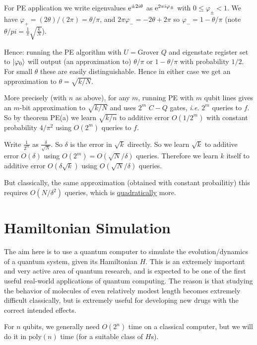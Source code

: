 \documentclass[]{article}
\renewcommand{\phi}{\varphi}
\newcommand{\poly}{\textrm{poly}}
\begin{document}
\begin{enumerate}
	For PE application we write eigenvalues $\mathrm{e}^{\pm2i\theta}$ as $\e^{2\pi i\phi_{\pm}}$ with $0\le \phi_{\pm} < 1$. We have $\phi_+ = (2\theta)/(2\pi) = \theta/\pi$, and $2\pi \phi_- = -2\theta+2\pi$ so $\phi_- = 1 - \theta/\pi$ (note $\theta/pi = \frac{1}{\pi}\sqrt{\frac{k}{N}}$).

	Hence: running the PE algorithm with $U = \textrm{Grover }Q$ and eigenstate register set to $\ket{\phi_0}$ will output (an approximation to) $\theta/\pi$ or $1 - \theta/\pi$ with probability $1/2$. For small $\theta$ these are easily distinguishable. Hence in either case we get an approximation to $\theta = \sqrt{k/N}$.

	More precisely (with $n$ as above), for any $m$, running PE with $m$ qubit lines gives an $m$-bit approximation to $\sqrt{k/N}$ and uses $2^m$ $C-Q$ gates, \textit{i.e.} $2^m$ queries to $f$. So by theorem PE(a) we learn $\sqrt{k/n}$ to additive error $O(1/2^m)$ with constant probability $4/\pi^2$ using $O(2^m)$ queries to $f$.

	Write $\frac{1}{2^m}$ as $\frac{\delta}{\sqrt{N}}$. So $\delta$ is the error in $\sqrt{k}$ directly. So we learn $\sqrt{k}$ to additive error $O(\delta)$ using $O(2^m) = O(\sqrt{N}/\delta)$ queries. Therefore we learn $k$ itself to additive error $O(\delta\sqrt{k})$ using $O(\sqrt{N}/\delta)$ queries.

	But classically, the same approximation (obtained with constant probailitiy) this requires $O(N/\delta^2)$ queries, which is \underline{quadratically} more.

\end{enumerate}

\section{Hamiltonian Simulation}

The aim here is to use a quantum computer to simulate the evolution/dynamics of a quantum system, given its Hamiltonian $H$. This is an extremely important and very active area of quantum research, and is expected to be one of the first useful real-world applications of quantum computing. The reason is that studying the behavior of molecules of even relatively modest length becomes extremely difficult classically, but is extremely useful for developing new drugs with the correct intended effects.

For $n$ qubits, we generally need $O(2^n)$ time on a classical computer, but we will do it in $\poly(n)$ time (for a suitable class of $H$s).
\end{document}
